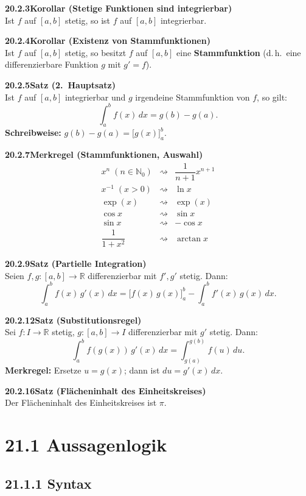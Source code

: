 \documentclass[a4paper,12pt]{article}
\newcommand{\gentry}[3]{%
  \noindent\textbf{#1\quad #2}\nopagebreak\\[0.2em]
  #3\par\smallskip
}
\begin{document}
\gentry{20.2.3}{Korollar (Stetige Funktionen sind integrierbar)}{%
  Ist $f$ auf $[a,b]$ stetig, so ist $f$ auf $[a,b]$ integrierbar.
}

\gentry{20.2.4}{Korollar (Existenz von Stammfunktionen)}{%
  Ist $f$ auf $[a,b]$ stetig, so besitzt $f$ auf $[a,b]$ eine
  \textbf{Stammfunktion} (d.\,h.\ eine differenzierbare Funktion $g$ mit $g' = f$).
}

\gentry{20.2.5}{Satz (2.\ Hauptsatz)}{%
  Ist $f$ auf $[a,b]$ integrierbar und $g$ irgendeine Stammfunktion von $f$, so gilt:
  \[
    \int_a^b f(x)\,dx = g(b) - g(a).
  \]
  \textbf{Schreibweise:} $g(b) - g(a) = \bigl[g(x)\bigr]_a^b$.
}

\gentry{20.2.7}{Merkregel (Stammfunktionen, Auswahl)}{%
  \[
  \begin{array}{lll}
    x^n \;(n \in \mathbb{N}_0) & \rightsquigarrow & \dfrac{1}{n+1} x^{n+1}\\[5pt]
    x^{-1} \;(x>0) & \rightsquigarrow & \ln x\\[5pt]
    \exp(x) & \rightsquigarrow & \exp(x)\\[5pt]
    \cos x & \rightsquigarrow & \sin x\\[5pt]
    \sin x & \rightsquigarrow & -\cos x\\[5pt]
    \dfrac{1}{1+x^2} & \rightsquigarrow & \arctan x
  \end{array}
  \]
}

\gentry{20.2.9}{Satz (Partielle Integration)}{%
  Seien $f, g : [a,b] \to \mathbb{R}$ differenzierbar mit $f', g'$ stetig. Dann:
  \[
    \int_a^b f(x)\,g'(x)\,dx
    = \bigl[f(x)\,g(x)\bigr]_a^b - \int_a^b f'(x)\,g(x)\,dx.
  \]
}

\gentry{20.2.12}{Satz (Substitutionsregel)}{%
  Sei $f : I \to \mathbb{R}$ stetig, $g : [a,b] \to I$ differenzierbar mit $g'$ stetig. Dann:
  \[
    \int_a^b f(g(x))\,g'(x)\,dx = \int_{g(a)}^{g(b)} f(u)\,du.
  \]
  \textbf{Merkregel:} Ersetze $u = g(x)$; dann ist $du = g'(x)\,dx$.
}

\gentry{20.2.16}{Satz (Flächeninhalt des Einheitskreises)}{%
  Der Flächeninhalt des Einheitskreises ist $\pi$.
}

\section*{21.1 \quad Aussagenlogik}

\subsection*{21.1.1 Syntax}
\end{document}
